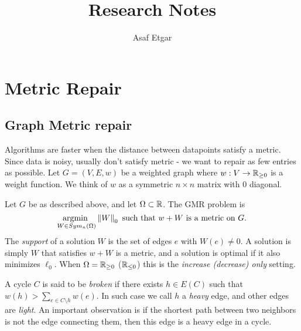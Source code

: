 \documentclass[a4paper, 10pt]{book}
\title{Research Notes}
\author{Asaf Etgar}
\begin{document}
\maketitle
\chapter{Metric Repair}
\section{Graph Metric repair}
Algorithms are faster when the distance between datapoints satisfy a metric. Since data is noisy, usually don't satisfy metric - we want to repair as few entries as possible. 
	Let $G = (V,E,w)$ be a weighted graph where $w:V\to \mathbb{R}_{\ge 0}$ is a weight function. We think of $w$ as a symmetric $n\times n$ matrix with $0$ diagonal.
	\begin{defn} Let $G$ be as described above, and let $\Omega\subset \mathbb{R}$. The GMR problem is 
	\[\underset{ W\in Sym_{n}(\Omega) }{\textrm{argmin }} \left\|W\right\|_0 \text{ such that }w + W \text{ is a metric on }G.
	\]
	The \emph{support} of a solution $W$ is the set of edges $e$ with $W(e)\ne 0$. A solution is simply $W$ that satisfies $w+W$ is a metric, and a solution is optimal if it also minimizes $\ell_0$.
	When $\Omega = \mathbb{R}_{\ge 0}$ ($\mathbb{R}_{\le 0}$) this is the \emph{increase (decrease) only} setting. 
	\end{defn}
	A cycle $C$ is said to be \emph{broken} if there exists $h\in E(C)$ such that $w(h) > \sum_{e\in C\setminus h}w(e)$. In such case we call $h$ a \emph{heavy} edge, and other edges are \emph{light}. An important observation is if the shortest path between two neighbors is not the edge connecting them, then this edge is a heavy edge in a cycle.\\
	
\end{document}
